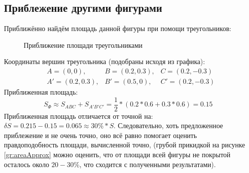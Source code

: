 \documentclass[12pt, a4paper]{article}
\begin{document}
\subsection{Приблежение другими фигурами}
Приближённо найдём площадь данной фигуры при помощи треугольников:
\begin{figure}[H]
\caption{Приближение площади треугольниками}
\label{gr:curveByTrigs}
\end{figure}
Координаты вершин треугольника (подобраны исходя из графика):
\begin{equation}
\begin{aligned}
&A = (0,0), &B = (0.2,0.3), &C = (0.2,-0.3)\\
&A' =(0.2,0.3), &B' = (0.5,0),  &C' = (0.2,-0.3)
\end{aligned}
\end{equation}
Приближенная площадь:
\begin{equation*}
S_\Phi \approx S_{ABC} + S_{A'B'C'} = \frac{1}{2} * (0.2 * 0.6 + 0.3 * 0.6) = 0.15 
\end{equation*}
Приближенная площадь отличается от точной на: $\delta S = 0.215 - 0.15 = 0.065 \approx 30\% * S$. Следовательно, хоть предложенное приблежение и не очень точно, оно всё равно помогает оценить правдоподобность площади, вычисленной точно, (грубой прикидкой на рисунке \ref{gr:areaApprox} можно оценить, что от площади всей фигуры не покрытой осталось около $20-30\%$, что сходится с полученными результатами).
\end{document}
